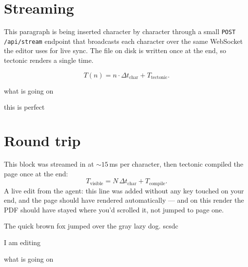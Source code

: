 \documentclass[11pt]{article}
\begin{document}
\section*{Streaming}

This paragraph is being inserted character by character through a small
\texttt{POST /api/stream} endpoint that broadcasts each character over
the same WebSocket the editor uses for live sync. The file on disk is
written once at the end, so tectonic renders a single time.

\[
  T(n) = n \cdot \Delta t_{\text{char}} + T_{\text{tectonic}}.
\]

what is going on

this is perfect


\section*{Round trip}

This block was streamed in at $\sim 15$\,ms per character, then tectonic compiled the page once at the end:
\[
  T_{\text{visible}} = N \,\Delta t_{\text{char}} + T_{\text{compile}}.
\]
A live edit from the agent: this line was added without any key touched
on your end, and the page should have rendered automatically --- and on this render the
PDF should have stayed where you'd scrolled it, not jumped to page one.

The quick brown fox jumped over the gray lazy dog. scsdc


I am editing

what is going on
\end{document}
